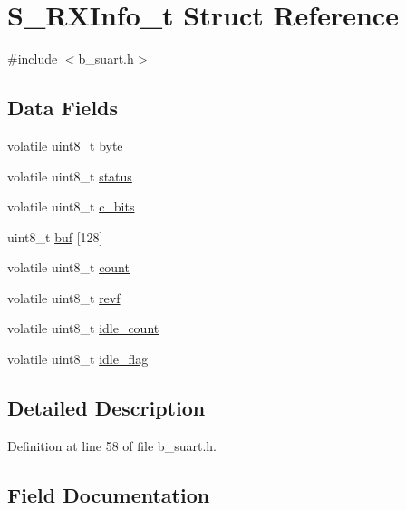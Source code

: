 \hypertarget{struct_s___r_x_info__t}{}\section{S\+\_\+\+R\+X\+Info\+\_\+t Struct Reference}
\label{struct_s___r_x_info__t}


{\ttfamily \#include $<$b\+\_\+suart.\+h$>$}

\subsection*{Data Fields}
\begin{DoxyCompactItemize}
\item 
volatile uint8\+\_\+t \mbox{\hyperlink{struct_s___r_x_info__t_a62e96a9ecdde0ab8494d1dae9762f595}{byte}}
\item 
volatile uint8\+\_\+t \mbox{\hyperlink{struct_s___r_x_info__t_afea475b453c81c5b3f5a31abb861edfb}{status}}
\item 
volatile uint8\+\_\+t \mbox{\hyperlink{struct_s___r_x_info__t_a533890957460cf4f360cf222426df810}{c\+\_\+bits}}
\item 
uint8\+\_\+t \mbox{\hyperlink{struct_s___r_x_info__t_aa2665ebcc94066966583ee7c2c754862}{buf}} \mbox{[}128\mbox{]}
\item 
volatile uint8\+\_\+t \mbox{\hyperlink{struct_s___r_x_info__t_aef4c4f3630ede69cba8c75369a5459af}{count}}
\item 
volatile uint8\+\_\+t \mbox{\hyperlink{struct_s___r_x_info__t_a34ed48d0499d28be718165306a573aeb}{revf}}
\item 
volatile uint8\+\_\+t \mbox{\hyperlink{struct_s___r_x_info__t_a2fca36c37bbd385665d8d422df068370}{idle\+\_\+count}}
\item 
volatile uint8\+\_\+t \mbox{\hyperlink{struct_s___r_x_info__t_a02fecce62db76d446cceec8d87e330f9}{idle\+\_\+flag}}
\end{DoxyCompactItemize}


\subsection{Detailed Description}


Definition at line 58 of file b\+\_\+suart.\+h.



\subsection{Field Documentation}
\mbox{\label{struct_s___r_x_info__t_aa2665ebcc94066966583ee7c2c754862}} 
